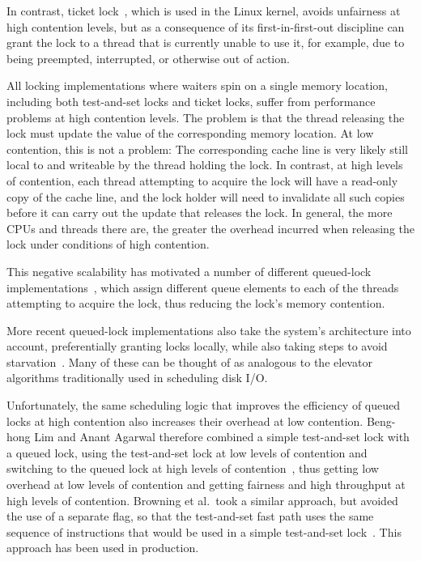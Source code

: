 In contrast, ticket lock~\cite{MellorCrummey91a}, which is used in the Linux
kernel, avoids unfairness at high contention levels, but as a
consequence of its first-in-first-out discipline can grant the
lock to a thread that is currently unable to use it, for example,
due to being preempted, interrupted, or otherwise out of action.

All locking implementations where waiters spin on a single memory
location, including both test-and-set locks and ticket locks,
suffer from performance problems at high contention levels.
The problem is that the thread releasing the lock must update the
value of the corresponding memory location.
At low contention, this is not a problem: The corresponding cache line
is very likely still local to and writeable by the thread holding
the lock.
In contrast, at high levels of contention, each thread attempting to
acquire the lock will have a read-only copy of the cache line, and
the lock holder will need to invalidate all such copies before it
can carry out the update that releases the lock.
In general, the more CPUs and threads there are, the greater the
overhead incurred when releasing the lock under conditions of
high contention.

This negative scalability has motivated a number of different
queued-lock
implementations~\cite{Anderson90,Graunke90,MellorCrummey91a,Wisniewski94,Craig93,Magnusson94,Takada93},
which assign different queue elements to each of the threads attempting
to acquire the lock, thus reducing the lock's memory contention.

More recent queued-lock implementations also take the system's architecture
into account, preferentially granting locks locally, while also taking
steps to avoid
starvation~\cite{McKenney02e,radovic03hierarchical,radovic02efficient,BenJackson02,McKenney02d}.
Many of these can be thought of as analogous to the elevator algorithms
traditionally used in scheduling disk I/O.

Unfortunately, the same scheduling logic that improves the efficiency
of queued locks at high contention also increases their overhead at
low contention.
Beng-hong Lim and Anant Agarwal therefore combined a simple test-and-set
lock with a queued lock, using the test-and-set lock at low levels of
contention and switching to the queued lock at high levels of
contention~\cite{BengHongLim94}, thus getting low overhead at low levels
of contention and getting fairness and high throughput at high levels
of contention.
Browning et al.~took a similar approach, but avoided the use of a separate
flag, so that the test-and-set fast path uses the same sequence of
instructions that would be used in a simple test-and-set
lock~\cite{LukeBrowning2005SimpleLockNUMAAware}.
This approach has been used in production.


